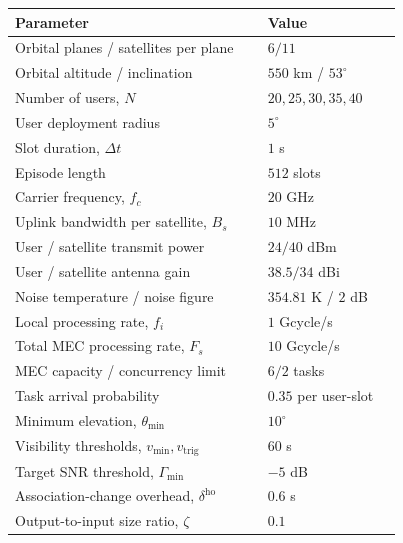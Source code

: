 \begin{strip}
\noindent
\begin{minipage}[t]{0.485\textwidth}
\vspace{0pt}
\LEOTableSetup
{}
    \label{tab:simulation_parameters}
    \centering
    \footnotesize
    \renewcommand{\arraystretch}{1.08}
    \setlength{\tabcolsep}{4pt}
    \begin{tabular}{p{0.60\linewidth}p{0.32\linewidth}}
        \hline
        Parameter & Value \\
        \hline
        Orbital planes / satellites per plane & $6/11$ \\
        Orbital altitude / inclination & $550$ km / $53^\circ$ \\
        Number of users, $N$ & $20,25,30,35,40$ \\
        User deployment radius & $5^\circ$ \\
        Slot duration, $\Delta t$ & $1$ s \\
        Episode length & $512$ slots \\
        Carrier frequency, $f_c$ & $20$ GHz \\
        Uplink bandwidth per satellite, $B_s$ & $10$ MHz \\
        User / satellite transmit power & $24/40$ dBm \\
        User / satellite antenna gain & $38.5/34$ dBi \\
        Noise temperature / noise figure & $354.81$ K / $2$ dB \\
        Local processing rate, $f_i$ & $1$ Gcycle/s \\
        Total MEC processing rate, $F_s$ & $10$ Gcycle/s \\
        MEC capacity / concurrency limit & $6/2$ tasks \\
        Task arrival probability & $0.35$ per user-slot \\
        Minimum elevation, $\theta_{\min}$ & $10^\circ$ \\
        Visibility thresholds, $v_{\min},v_{\mathrm{trig}}$
        & $60$ s \\
        Target SNR threshold, $\Gamma_{\min}$ & $-5$ dB \\
        Association-change overhead, $\delta^{\mathrm{ho}}$
        & $0.6$ s \\
        Output-to-input size ratio, $\zeta$ & $0.1$ \\

\end{tabular}
\end{minipage}
\end{strip}
